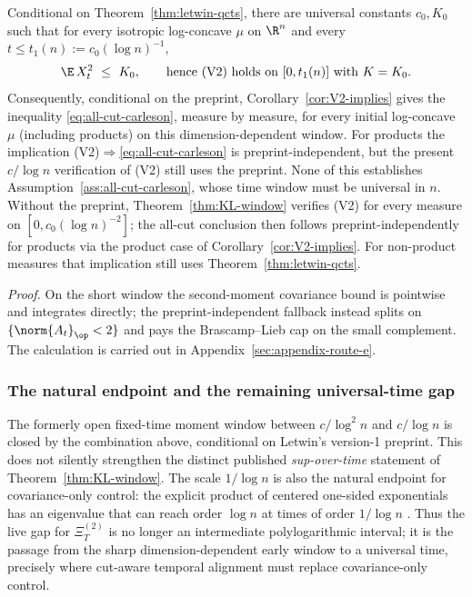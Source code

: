 \documentclass[../../main.tex]{subfiles}
\begin{document}
\begin{theorem}
\label{thm:V2-window}
Conditional on Theorem~\ref{thm:letwin-qcts}, there are universal constants $c_0,K_0$ such that
for every isotropic log-concave $\mu$ on $\R^n$ and every
$t\le t_1(n):=c_0(\log n)^{-1}$,
\[
  \E\,X_t^2\ \le\ K_0 ,
  \qquad\text{hence \textup{(V2)} holds on }[0,t_1(n)]\text{ with }K=K_0 .
\]
Consequently, conditional on the preprint, Corollary~\textup{\ref{cor:V2-implies}} gives the
inequality \eqref{eq:all-cut-carleson}, measure by measure, for every initial log-concave $\mu$
(including products) on this dimension-dependent window. For products the implication
\textup{(V2)}$\Rightarrow$\eqref{eq:all-cut-carleson} is preprint-independent, but the present
$c/\log n$ verification of \textup{(V2)} still uses the preprint. None of this establishes
Assumption~\ref{ass:all-cut-carleson}, whose time window must be universal in $n$. Without the
preprint, Theorem~\ref{thm:KL-window} verifies \textup{(V2)} for every measure on
$[0,c_0(\log n)^{-2}]$; the all-cut conclusion then follows preprint-independently for products
via the product case of Corollary~\ref{cor:V2-implies}. For non-product measures that implication
still uses Theorem~\ref{thm:letwin-qcts}.
\end{theorem}

\noindent\emph{Proof.} On the short window the second-moment covariance bound is pointwise and integrates directly; the preprint-independent fallback instead splits on $\{\norm{A_t}_\op<2\}$ and pays the Brascamp--Lieb cap on the small complement. The calculation is carried out in Appendix~\ref{sec:appendix-route-e}.

\subsubsection{The natural endpoint and the remaining universal-time gap}

The formerly open fixed-time moment window between $c/\log^2n$ and $c/\log n$ is closed by the
combination above, conditional on Letwin's version-1 preprint. This does not silently strengthen
the distinct published \emph{sup-over-time} statement of Theorem~\ref{thm:KL-window}. The scale
$1/\log n$ is also the natural endpoint for covariance-only control: the explicit product of
centered one-sided exponentials has an eigenvalue that can reach order $\log n$ at times of order
$1/\log n$ \cite[Remarks~62, 64 and Prop.~65]{KLnotes}. Thus the live gap for
$\Xi_T^{(2)}$ is no longer an intermediate polylogarithmic interval; it is the passage from the
sharp dimension-dependent early window to a universal time, precisely where cut-aware temporal
alignment must replace covariance-only control.
\end{document}
